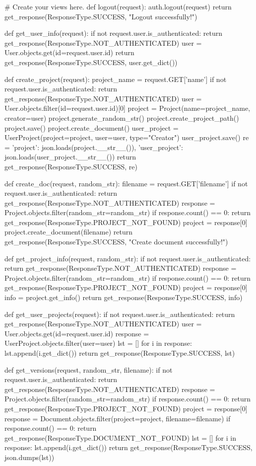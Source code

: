 # Create your views here.
def logout(request):
    auth.logout(request)
    return get_response(ResponseType.SUCCESS, "Logout successfully!")


def get_user_info(request):
    if not request.user.is_authenticated:
        return get_response(ResponseType.NOT_AUTHENTICATED)
    user = User.objects.get(id=request.user.id)
    return get_response(ResponseType.SUCCESS, user.get_dict())


def create_project(request):
    project_name = request.GET['name']
    if not request.user.is_authenticated:
        return get_response(ResponseType.NOT_AUTHENTICATED)
    user = User.objects.filter(id=request.user.id)[0]
    project = Project(name=project_name, creator=user)
    project.generate_random_str()
    project.create_project_path()
    project.save()
    project.create_document()
    user_project = UserProject(project=project, user=user, type="Creator")
    user_project.save()
    re = {'project': json.loads(project.__str__()), 'user_project': json.loads(user_project.__str__())}
    return get_response(ResponseType.SUCCESS, re)


def create_doc(request, random_str):
    filename = request.GET['filename']
    if not request.user.is_authenticated:
        return get_response(ResponseType.NOT_AUTHENTICATED)
    response = Project.objects.filter(random_str=random_str)
    if response.count() == 0:
        return get_response(ResponseType.PROJECT_NOT_FOUND)
    project = response[0]
    project.create_document(filename)
    return get_response(ResponseType.SUCCESS, "Create document successfully!")


def get_project_info(request, random_str):
    if not request.user.is_authenticated:
        return get_response(ResponseType.NOT_AUTHENTICATED)
    response = Project.objects.filter(random_str=random_str)
    if response.count() == 0:
        return get_response(ResponseType.PROJECT_NOT_FOUND)
    project = response[0]
    info = project.get_info()
    return get_response(ResponseType.SUCCESS, info)


def get_user_projects(request):
    if not request.user.is_authenticated:
        return get_response(ResponseType.NOT_AUTHENTICATED)
    user = User.objects.get(id=request.user.id)
    response = UserProject.objects.filter(user=user)
    lst = []
    for i in response:
        lst.append(i.get_dict())
    return get_response(ResponseType.SUCCESS, lst)


def get_versions(request, random_str, filename):
    if not request.user.is_authenticated:
        return get_response(ResponseType.NOT_AUTHENTICATED)
    response = Project.objects.filter(random_str=random_str)
    if response.count() == 0:
        return get_response(ResponseType.PROJECT_NOT_FOUND)
    project = response[0]
    response = Document.objects.filter(project=project, filename=filename)
    if response.count() == 0:
        return get_response(ResponseType.DOCUMENT_NOT_FOUND)
    lst = []
    for i in response:
        lst.append(i.get_dict())
    return get_response(ResponseType.SUCCESS, json.dumps(lst))


